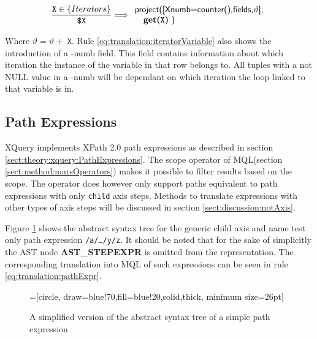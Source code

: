 \begin{equation}
\centering
\frac{\displaystyle \texttt{X} \in \left\{ Iterators \right\}}
	{\displaystyle \texttt{\$X}}
\Longrightarrow
\begin{array}{l}
	\mbox{\textsf{project([Xnumb=counter(),fields,}} \vartheta
	\mbox{\textsf{];}}
	\\ \quad
	\mbox{\textbf{get(}\texttt{X}\textbf{)} \textsf{)}}
\end{array}
\label{eq:translation:iteratorVariable}
\end{equation}

Where $\vartheta = \vartheta + $ \texttt{X}.
Rule \ref{eq:translation:iteratorVariable} also shows the introduction of a -\textsf{numb} field. This field
contains information about which iteration the instance of the variable in that row belongs to. All tuples with a
not \textsf{NULL} value in a -\textsf{numb} will be dependant on which iteration the loop linked to that variable
is in.


\subsection{Path Expressions}
\label{sect:translation:mXr:smpPathExpr}
XQuery implements XPath 2.0 path expressions as described in section
\ref{sect:theory:xquery:PathExpressions}. The \textsf{scope} operator of
MQL(section \ref{sect:method:marsOperators}) makes it possible to
filter results based on the scope. The operator does however only support paths
equivalent to path expressions with only \texttt{child} axis steps. Methods to
translate expressions with other types of axis steps will be discussed in
section \ref{sect:discussion:notAxis}.

Figure \ref{fig:translation:pathAST} shows the abstract syntax tree for the
generic child axis and name test only path expression \texttt{/a/\ldots/y/z}. It
should be noted that for the sake of simplicitly the AST node \textbf{AST\_STEPEXPR} is
omitted from the representation. The corresponding translation into MQL of such
expressions can be seen in rule \ref{eq:translation:pathExpr}.


\begin{figure}[h]
\centering
{}=[circle, draw=blue!70,fill=blue!20,solid,thick, minimum
size=26pt]
\label{fig:translation:pathAST}
\caption[AST of path expression]{A simplified version of the abstract syntax
tree of a simple path expression}
\end{figure}


